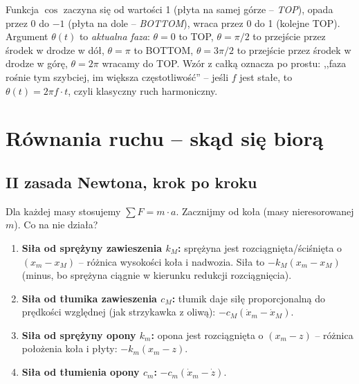 \documentclass[11pt,a4paper]{article}
\theoremstyle{plainpol}
\begin{document}
\begin{intuicja}
Funkcja $\cos$ zaczyna się od wartości 1 (płyta na samej górze --
\emph{TOP}), opada przez 0 do $-1$ (płyta na dole --
\emph{BOTTOM}), wraca przez 0 do 1 (kolejne TOP). Argument $\theta(t)$
to \emph{aktualna faza}: $\theta=0$ to TOP, $\theta=\pi/2$ to przejście
przez środek w drodze w dół, $\theta=\pi$ to BOTTOM, $\theta=3\pi/2$ to
przejście przez środek w drodze w górę, $\theta=2\pi$ wracamy do TOP.
Wzór z całką oznacza po prostu: ,,faza rośnie tym szybciej, im większa
częstotliwość'' -- jeśli $f$ jest stałe, to $\theta(t) = 2\pi f\cdot t$,
czyli klasyczny ruch harmoniczny.
\end{intuicja}

\section{Równania ruchu -- skąd się biorą}\label{sec:rownania}

\subsection{II zasada Newtona, krok po kroku}

Dla każdej masy stosujemy $\sum F = m\cdot a$. Zacznijmy od koła
(masy nieresorowanej $m$). Co na nie działa?

\begin{enumerate}
  \item \textbf{Siła od sprężyny zawieszenia $k_M$:} sprężyna jest
    rozciągnięta/ściśnięta o $(x_m - x_M)$ -- różnica wysokości koła
    i nadwozia. Siła to $-k_M(x_m - x_M)$ (minus, bo sprężyna ciągnie
    w kierunku redukcji rozciągnięcia).

  \item \textbf{Siła od tłumika zawieszenia $c_M$:} tłumik daje siłę
    proporcjonalną do prędkości względnej (jak strzykawka z oliwą):
    $-c_M(\dot{x}_m - \dot{x}_M)$.

  \item \textbf{Siła od sprężyny opony $k_m$:} opona jest rozciągnięta
    o $(x_m - z)$ -- różnica położenia koła i płyty:
    $-k_m(x_m - z)$.

  \item \textbf{Siła od tłumienia opony $c_m$:} $-c_m(\dot{x}_m - \dot{z})$.
\end{enumerate}
\end{document}

